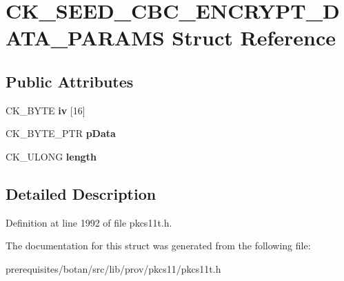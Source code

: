 \hypertarget{struct_c_k___s_e_e_d___c_b_c___e_n_c_r_y_p_t___d_a_t_a___p_a_r_a_m_s}{}\section{C\+K\+\_\+\+S\+E\+E\+D\+\_\+\+C\+B\+C\+\_\+\+E\+N\+C\+R\+Y\+P\+T\+\_\+\+D\+A\+T\+A\+\_\+\+P\+A\+R\+A\+MS Struct Reference}
\label{struct_c_k___s_e_e_d___c_b_c___e_n_c_r_y_p_t___d_a_t_a___p_a_r_a_m_s}
\subsection*{Public Attributes}
\begin{DoxyCompactItemize}
\item 
\mbox{\label{struct_c_k___s_e_e_d___c_b_c___e_n_c_r_y_p_t___d_a_t_a___p_a_r_a_m_s_a3188d7402716451340f16de71cd24f11}} 
C\+K\+\_\+\+B\+Y\+TE {\bfseries iv} \mbox{[}16\mbox{]}
\item 
\mbox{\label{struct_c_k___s_e_e_d___c_b_c___e_n_c_r_y_p_t___d_a_t_a___p_a_r_a_m_s_a331d7ad272c1ea3e1feac85ef26dbade}} 
C\+K\+\_\+\+B\+Y\+T\+E\+\_\+\+P\+TR {\bfseries p\+Data}
\item 
\mbox{\label{struct_c_k___s_e_e_d___c_b_c___e_n_c_r_y_p_t___d_a_t_a___p_a_r_a_m_s_a31654320ef995adad7d8a9cde0575fa2}} 
C\+K\+\_\+\+U\+L\+O\+NG {\bfseries length}
\end{DoxyCompactItemize}


\subsection{Detailed Description}


Definition at line 1992 of file pkcs11t.\+h.



The documentation for this struct was generated from the following file\+:\begin{DoxyCompactItemize}
\item 
prerequisites/botan/src/lib/prov/pkcs11/pkcs11t.\+h\end{DoxyCompactItemize}
